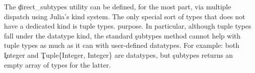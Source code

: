 The \c{direct_subtypes} utility can be defined, for the most part, via multiple dispatch
using Julia's kind system.
The only special sort of types that does not have a dedicated kind is tuple types.
purpose. In particular, although tuple types fall under the datatype kind,
the standard \c{subtypes} method cannot help with tuple types as much as it can with user-defined datatypes.
For example:
both \c{Integer} and \c{Tuple\{Integer, Integer\}} are datatypes, but
\c{subtypes} returns an empty array of types for the latter.

%


